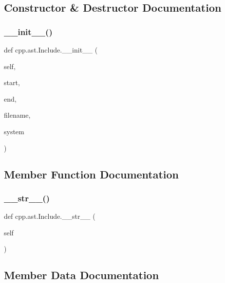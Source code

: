 \subsection{Constructor \& Destructor Documentation}
\mbox{\label{classcpp_1_1ast_1_1_include_a41b000a9f16a9a1840e56a761bb7045c}} 
\subsubsection{\texorpdfstring{\_\_init\_\_()}{\_\_init\_\_()}}
{\footnotesize\ttfamily def cpp.\+ast.\+Include.\+\_\+\+\_\+init\+\_\+\+\_\+ (\begin{DoxyParamCaption}\item[{}]{self,  }\item[{}]{start,  }\item[{}]{end,  }\item[{}]{filename,  }\item[{}]{system }\end{DoxyParamCaption})}



\subsection{Member Function Documentation}
\mbox{\label{classcpp_1_1ast_1_1_include_ad7d9e5e8f46dcb1a91a282e609412a3e}} 
\subsubsection{\texorpdfstring{\_\_str\_\_()}{\_\_str\_\_()}}
{\footnotesize\ttfamily def cpp.\+ast.\+Include.\+\_\+\+\_\+str\+\_\+\+\_\+ (\begin{DoxyParamCaption}\item[{}]{self }\end{DoxyParamCaption})}



\subsection{Member Data Documentation}
\mbox{\label{classcpp_1_1ast_1_1_include_a9ecff64f127655d3c17e9abe4ebe3852}} 
